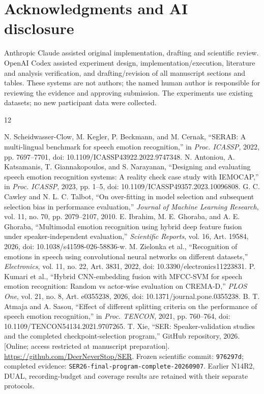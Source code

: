 \documentclass[letterpaper]{article}
\begin{document}
\section{Acknowledgments and AI disclosure}
Anthropic Claude assisted original implementation, drafting and scientific review. OpenAI Codex assisted experiment design, implementation/execution, literature and analysis verification, and drafting/revision of all manuscript sections and tables. These systems are not authors; the named human author is responsible for reviewing the evidence and approving submission. The experiments use existing datasets; no new participant data were collected.

\clearpage
\begin{thebibliography}{12}
\raggedright
{} N. Scheidwasser-Clow, M. Kegler, P. Beckmann, and M. Cernak, ``SERAB: A multi-lingual benchmark for speech emotion recognition,'' in \emph{Proc. ICASSP}, 2022, pp. 7697--7701, doi: 10.1109/ICASSP43922.2022.9747348.
 N. Antoniou, A. Katsamanis, T. Giannakopoulos, and S. Narayanan, ``Designing and evaluating speech emotion recognition systems: A reality check case study with IEMOCAP,'' in \emph{Proc. ICASSP}, 2023, pp. 1--5, doi: 10.1109/ICASSP49357.2023.10096808.
 G. C. Cawley and N. L. C. Talbot, ``On over-fitting in model selection and subsequent selection bias in performance evaluation,'' \emph{Journal of Machine Learning Research}, vol. 11, no. 70, pp. 2079--2107, 2010.
 E. Ibrahim, M. E. Ghoraba, and A. E. Ghoraba, ``Multimodal emotion recognition using hybrid deep feature fusion under speaker-independent evaluation,'' \emph{Scientific Reports}, vol. 16, Art. 19584, 2026, doi: 10.1038/s41598-026-58836-w.
 M. Zielonka et al., ``Recognition of emotions in speech using convolutional neural networks on different datasets,'' \emph{Electronics}, vol. 11, no. 22, Art. 3831, 2022, doi: 10.3390/electronics11223831.
 P. Kumari et al., ``Hybrid CNN-embedding fusion with MFCC-SVM for speech emotion recognition: Random vs actor-wise evaluation on CREMA-D,'' \emph{PLOS One}, vol. 21, no. 8, Art. e0355238, 2026, doi: 10.1371/journal.pone.0355238.
 B. T. Atmaja and A. Sasou, ``Effect of different splitting criteria on the performance of speech emotion recognition,'' in \emph{Proc. TENCON}, 2021, pp. 760--764, doi: 10.1109/TENCON54134.2021.9707265.
 T. Xie, ``SER: Speaker-validation studies and the completed checkpoint-selection program,'' GitHub repository, 2026. [Online; access restricted at manuscript preparation]. \url{https://github.com/DeerNeverStop/SER}. Frozen scientific commit: \texttt{976297d}; completed evidence: \texttt{SER26-final-program-}\allowbreak\texttt{complete-20260907}. Earlier N14R2, DUAL, recording-budget and coverage results are retained with their separate protocols.

\end{thebibliography}
\end{document}
